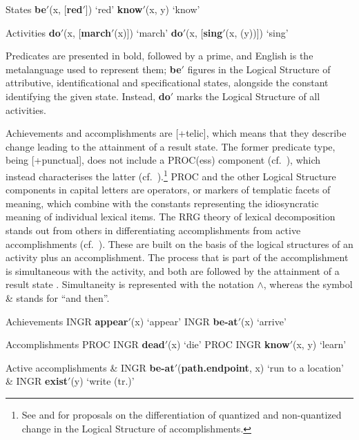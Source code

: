 \documentclass[output=paper,hidelinks]{langscibook}
\begin{document}
\ea%
   \label{ex:RRG:1}
   States
   \ea \textbf{be$'$}(x, [\textbf{red$'$}]) `red'
   \ex  \textbf{know$'$}(x, y) `know'
   \z\z

\newpage
\ea%
   \label{ex:RRG:2}
   Activities
\ea \textbf{do$'$}(x, [\textbf{march$'$}(x)]) `march'
\ex \textbf{do$'$}(x, [\textbf{sing$'$}(x, (y))]) `sing'
\z\z

\noindent Predicates are presented in bold, followed by a prime, and English is the metalanguage used to represent them;  \textbf{be$'$} figures in the Logical Structure of attributive, identificational and specificational states, alongside the constant identifying the given state. Instead, \textbf{do$'$} marks the Logical Structure of all activities.

  Achievements and accomplishments are [+telic], which means that they describe change leading to the attainment of a result state. The former predicate type, being [+punctual], does not include a PROC(ess) component (cf.\ ), which instead characterises the latter (cf.\ ).\footnote{See \citet{Bentley2019} and \citet{VanValin2022a} for proposals on the differentiation of quantized and non-quantized change in the Logical Structure of accomplishments.}  PROC and the other Logical Structure components in capital letters are operators, or markers of templatic facets of meaning, which combine with the constants representing the idiosyncratic meaning of individual lexical items. The RRG theory of lexical decomposition stands out from others in differentiating accomplishments from active accomplishments (cf.\ ). These are built on the basis of the logical structures of an activity plus an accomplishment. The process that is part of the accomplishment is simultaneous with the activity, and both are followed by the attainment of a result state \citep{VanValin2018}. Simultaneity is represented with the notation $\wedge$, whereas the symbol \& stands for ``and then''.

\ea%
   \label{ex:RRG:3} Achievements
\ea  INGR \textbf{appear$'$}(x) `appear'
\ex  INGR \textbf{be-at$'$}(x) `arrive'
  \z\z

\ea%
   \label{ex:RRG:4} Accomplishments
   \ea PROC INGR \textbf{dead$'$}(x) `die'
   \ex PROC INGR \textbf{know$'$}(x, y) `learn'
   \z\z


\ea%
   \label{ex:RRG:5} Active accomplishments
    \& INGR \textbf{be-at$'$}(\textbf{path.endpoint}, x) `run to a location'
    \& INGR \textbf{exist$'$}(y) `write (tr.)'
   \z\z
\end{document}
